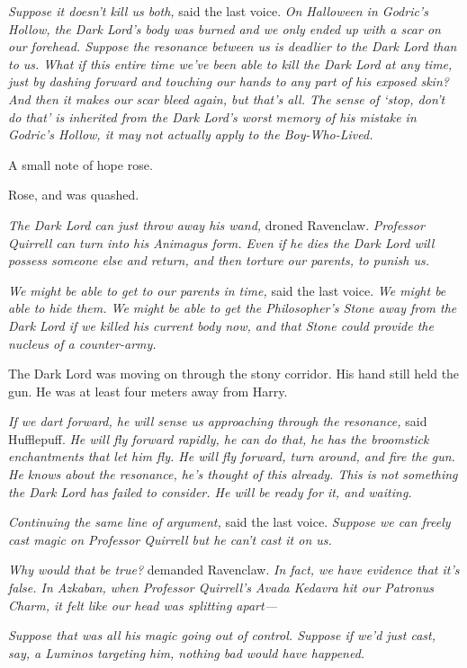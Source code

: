 \emph{Suppose it doesn't kill us both,} said the last voice. \emph{On Halloween in Godric's Hollow, the Dark Lord's body was burned and we only ended up with a scar on our forehead. Suppose the resonance between us is deadlier to the Dark Lord than to us. What if this entire time we've been able to kill the Dark Lord at any time, just by dashing forward and touching our hands to any part of his exposed skin? And then it makes our scar bleed again, but that's all. The sense of `stop, don't do that' is inherited from the Dark Lord's worst memory of his mistake in Godric's Hollow, it may not actually apply to the Boy-Who-Lived.}

A small note of hope rose.

Rose, and was quashed.

\emph{The Dark Lord can just throw away his wand,} droned Ravenclaw. \emph{Professor Quirrell can turn into his Animagus form. Even if he dies the Dark Lord will possess someone else and return, and then torture our parents, to punish us.}

\emph{We might be able to get to our parents in time,} said the last voice. \emph{We might be able to hide them. We might be able to get the Philosopher's Stone away from the Dark Lord if we killed his current body now, and that Stone could provide the nucleus of a counter-army.}

The Dark Lord was moving on through the stony corridor. His hand still held the gun. He was at least four meters away from Harry.

\emph{If we dart forward, he will sense us approaching through the resonance,} said Hufflepuff. \emph{He will fly forward rapidly, he can do that, he has the broomstick enchantments that let him fly. He will fly forward, turn around, and fire the gun. He knows about the resonance, he's thought of this already. This is not something the Dark Lord has failed to consider. He will be ready for it, and waiting.}

\emph{Continuing the same line of argument,} said the last voice. \emph{Suppose we can freely cast magic on Professor Quirrell but he can't cast it on us.}

\emph{Why would that be true?} demanded Ravenclaw. \emph{In fact, we have evidence that it's false. In Azkaban, when Professor Quirrell's Avada Kedavra hit our Patronus Charm, it felt like our head was splitting apart—}

\emph{Suppose that was all \emph{his} magic going out of control. Suppose if we'd just cast, say, a Luminos targeting him, nothing bad would have happened.}

